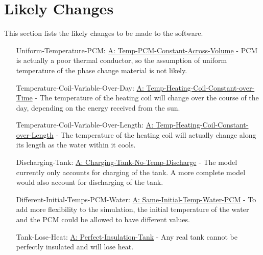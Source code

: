 \documentclass[12pt]{article}
\begin{document}
\section{Likely Changes}
\label{Sec:LCs}
This section lists the likely changes to be made to the software.
\begin{itemize}
\item[Uniform-Temperature-PCM:\phantomsection\label{likeChgUTP}]\hyperref[assumpTPCAV]{A: Temp-PCM-Constant-Across-Volume} - PCM is actually a poor thermal conductor, so the assumption of uniform temperature of the phase change material is not likely.
\item[Temperature-Coil-Variable-Over-Day:\phantomsection\label{likeChgTCVOD}]\hyperref[assumpTHCCoT]{A: Temp-Heating-Coil-Constant-over-Time} - The temperature of the heating coil will change over the course of the day, depending on the energy received from the sun.
\item[Temperature-Coil-Variable-Over-Length:\phantomsection\label{likeChgTCVOL}]\hyperref[assumpTHCCoL]{A: Temp-Heating-Coil-Constant-over-Length} - The temperature of the heating coil will actually change along its length as the water within it cools.
\item[Discharging-Tank:\phantomsection\label{likeChgDT}]\hyperref[assumpCTNOD]{A: Charging-Tank-No-Temp-Discharge} - The model currently only accounts for charging of the tank. A more complete model would also account for discharging of the tank.
\item[Different-Initial-Temps-PCM-Water:\phantomsection\label{likeChgDITPW}]\hyperref[assumpSITWP]{A: Same-Initial-Temp-Water-PCM} - To add more flexibility to the simulation, the initial temperature of the water and the PCM could be allowed to have different values.
\item[Tank-Lose-Heat:\phantomsection\label{likeChgTLH}]\hyperref[assumpPIT]{A: Perfect-Insulation-Tank} - Any real tank cannot be perfectly insulated and will lose heat.
\end{itemize}
\end{document}
